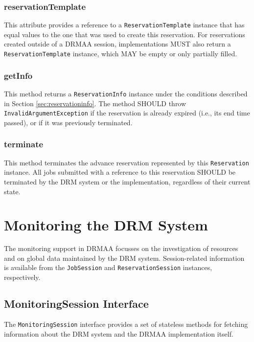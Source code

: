 \documentclass{article}
\newcommand{\h}[1]{\lstinline|#1|}
\begin{document}
\subsubsection{reservationTemplate}

This attribute provides a reference to a \h{ReservationTemplate} instance that has equal values to the one that was used to create this reservation. For reservations created outside of a DRMAA session, implementations MUST also return a \h{ReservationTemplate} instance, which MAY be empty or only partially filled.

\subsubsection{getInfo}
This method returns a \h{ReservationInfo} instance under the conditions described in Section \ref{sec:reservationinfo}. The method SHOULD throw \h{InvalidArgumentException} if the reservation is already expired (i.e., its end time passed), or if it was previously terminated. 

\subsubsection{terminate}

This method terminates the advance reservation represented by this \h{Reservation} instance. All jobs submitted with a reference to this reservation SHOULD be terminated by the DRM system or the implementation, regardless of their current state.

\section{Monitoring the DRM System}

The monitoring support in DRMAA focusses on the investigation of resources and on global data maintained by the DRM system. Session-related information is available from the \h{JobSession} and \h{ReservationSession} instances, respectively.

\subsection{MonitoringSession Interface}
\label{sec:monitoringsession}

The \h{MonitoringSession} interface provides a set of stateless methods for fetching information about the DRM system and the DRMAA implementation itself.


\end{document}
